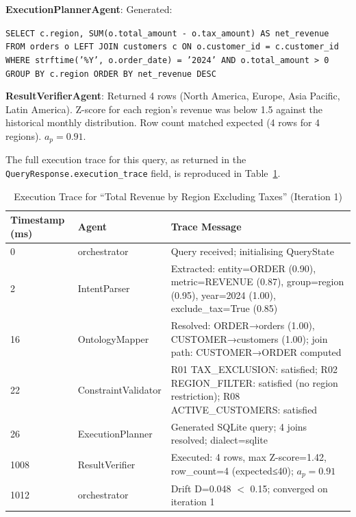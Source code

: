 \documentclass[12pt,a4paper]{report}
\begin{document}
\textbf{ExecutionPlannerAgent}: Generated:
\begin{center}
\texttt{SELECT c.region, SUM(o.total\_amount - o.tax\_amount) AS net\_revenue}\\
\texttt{FROM orders o LEFT JOIN customers c ON o.customer\_id = c.customer\_id}\\
\texttt{WHERE strftime('\%Y', o.order\_date) = '2024' AND o.total\_amount > 0}\\
\texttt{GROUP BY c.region ORDER BY net\_revenue DESC}
\end{center}

\textbf{ResultVerifierAgent}: Returned 4 rows (North America, Europe, Asia Pacific, Latin America). Z-score for each region's revenue was below 1.5 against the historical monthly distribution. Row count matched expected (4 rows for 4 regions). $a_p = 0.91$.

The full execution trace for this query, as returned in the \texttt{QueryResponse.execution\_trace} field, is reproduced in Table~\ref{tab:worked-trace}.

\begin{table}[H]
  \centering
  \caption{Execution Trace for ``Total Revenue by Region Excluding Taxes'' (Iteration 1)}
  \label{tab:worked-trace}
  \renewcommand{\arraystretch}{1.2}
  \begin{tabularx}{\textwidth}{@{}llX@{}}
    \toprule
    \textbf{Timestamp (ms)} & \textbf{Agent} & \textbf{Trace Message} \\
    \midrule
    0   & orchestrator     & Query received; initialising QueryState \\
    2   & IntentParser     & Extracted: entity=ORDER (0.90), metric=REVENUE (0.87), group=region (0.95), year=2024 (1.00), exclude\_tax=True (0.85) \\
    16  & OntologyMapper   & Resolved: ORDER→orders (1.00), CUSTOMER→customers (1.00); join path: CUSTOMER→ORDER computed \\
    22  & ConstraintValidator & R01 TAX\_EXCLUSION: satisfied; R02 REGION\_FILTER: satisfied (no region restriction); R08 ACTIVE\_CUSTOMERS: satisfied \\
    26  & ExecutionPlanner & Generated SQLite query; 4 joins resolved; dialect=sqlite \\
    1008 & ResultVerifier  & Executed: 4 rows, max Z-score=1.42, row\_count=4 (expected≤40); $a_p=0.91$ \\
    1012 & orchestrator    & Drift D=0.048 $<$ 0.15; converged on iteration 1 \\
    \bottomrule
  \end{tabularx}
\end{table}
\end{document}
